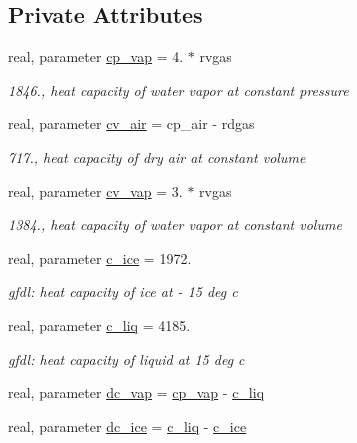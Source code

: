 \subsection*{Private Attributes}
\begin{DoxyCompactItemize}
\item 
real, parameter \hyperlink{classfv__cmp__mod_a7380eb8077e00279e9bb042e5a69f39b}{cp\-\_\-vap} = 4. $\ast$ rvgas
\begin{DoxyCompactList}\small\item\em 1846., heat capacity of water vapor at constant pressure \end{DoxyCompactList}\item 
real, parameter \hyperlink{classfv__cmp__mod_a6b7e31c99aaa43c3c88e5f148a0ada8c}{cv\-\_\-air} = cp\-\_\-air -\/ rdgas
\begin{DoxyCompactList}\small\item\em 717., heat capacity of dry air at constant volume \end{DoxyCompactList}\item 
real, parameter \hyperlink{classfv__cmp__mod_a1aff52f3ef1654b16d21ca8deade4099}{cv\-\_\-vap} = 3. $\ast$ rvgas
\begin{DoxyCompactList}\small\item\em 1384., heat capacity of water vapor at constant volume \end{DoxyCompactList}\item 
real, parameter \hyperlink{classfv__cmp__mod_a2e2c6145d3f4ea50036930131b202ca4}{c\-\_\-ice} = 1972.
\begin{DoxyCompactList}\small\item\em gfdl\-: heat capacity of ice at -\/ 15 deg c \end{DoxyCompactList}\item 
real, parameter \hyperlink{classfv__cmp__mod_ae3486a6a9602d9d6d55f4935aa0ffb0b}{c\-\_\-liq} = 4185.
\begin{DoxyCompactList}\small\item\em gfdl\-: heat capacity of liquid at 15 deg c \end{DoxyCompactList}\item 
real, parameter \hyperlink{classfv__cmp__mod_abc256ef2779554c3fcc3d90607dbe03d}{dc\-\_\-vap} = \hyperlink{classfv__cmp__mod_a7380eb8077e00279e9bb042e5a69f39b}{cp\-\_\-vap} -\/ \hyperlink{classfv__cmp__mod_ae3486a6a9602d9d6d55f4935aa0ffb0b}{c\-\_\-liq}
\item 
real, parameter \hyperlink{classfv__cmp__mod_afe0a80520aff4b3aa44554dcbc54ccda}{dc\-\_\-ice} = \hyperlink{classfv__cmp__mod_ae3486a6a9602d9d6d55f4935aa0ffb0b}{c\-\_\-liq} -\/ \hyperlink{classfv__cmp__mod_a2e2c6145d3f4ea50036930131b202ca4}{c\-\_\-ice}

\end{DoxyCompactItemize}

